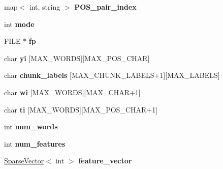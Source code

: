 \begin{DoxyCompactItemize}
\item 
\hypertarget{classFeatureset_ae2740a82c80640beeda36652d9054d51}{
map$<$ int, string $>$ {\bfseries POS\_\-pair\_\-index}}
\label{classFeatureset_ae2740a82c80640beeda36652d9054d51}

\item 
\hypertarget{classFeatureset_adbf07ae1d33c0671630c7673a7d6b43f}{
int {\bfseries mode}}
\label{classFeatureset_adbf07ae1d33c0671630c7673a7d6b43f}

\item 
\hypertarget{classFeatureset_ad97eaae71862389fe7190780c44363c1}{
FILE $\ast$ {\bfseries fp}}
\label{classFeatureset_ad97eaae71862389fe7190780c44363c1}

\item 
\hypertarget{classFeatureset_a54cf1154425bf0ddc0c26f50c7e67286}{
char {\bfseries yi} \mbox{[}MAX\_\-WORDS\mbox{]}\mbox{[}MAX\_\-POS\_\-CHAR\mbox{]}}
\label{classFeatureset_a54cf1154425bf0ddc0c26f50c7e67286}

\item 
\hypertarget{classFeatureset_a94122e2050c9d9cc12a7c472a8cb3751}{
char {\bfseries chunk\_\-labels} \mbox{[}MAX\_\-CHUNK\_\-LABELS+1\mbox{]}\mbox{[}MAX\_\-LABELS\mbox{]}}
\label{classFeatureset_a94122e2050c9d9cc12a7c472a8cb3751}

\item 
\hypertarget{classFeatureset_a6e95bf0b7504dee9000aef2bb22b8e48}{
char {\bfseries wi} \mbox{[}MAX\_\-WORDS\mbox{]}\mbox{[}MAX\_\-CHAR+1\mbox{]}}
\label{classFeatureset_a6e95bf0b7504dee9000aef2bb22b8e48}

\item 
\hypertarget{classFeatureset_a1f4c410af5b6ada8fd67d04e04d5749f}{
char {\bfseries ti} \mbox{[}MAX\_\-WORDS\mbox{]}\mbox{[}MAX\_\-POS\_\-CHAR+1\mbox{]}}
\label{classFeatureset_a1f4c410af5b6ada8fd67d04e04d5749f}

\item 
\hypertarget{classFeatureset_ae12a7a5e9326a0b88c9b36ef8f47b7bd}{
int {\bfseries num\_\-words}}
\label{classFeatureset_ae12a7a5e9326a0b88c9b36ef8f47b7bd}

\item 
\hypertarget{classFeatureset_a70d5c75d2f87eb334a3ff490d677540d}{
int {\bfseries num\_\-features}}
\label{classFeatureset_a70d5c75d2f87eb334a3ff490d677540d}

\item 
\hypertarget{classFeatureset_a6773cac2633074d872d6fba89f9df1a6}{
\hyperlink{classSparseVector}{SparseVector}$<$ int $>$ {\bfseries feature\_\-vector}}
\label{classFeatureset_a6773cac2633074d872d6fba89f9df1a6}


\end{DoxyCompactItemize}

